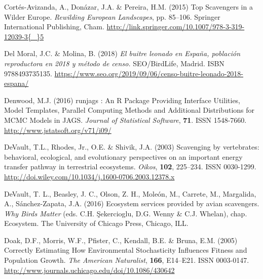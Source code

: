 \documentclass[12pt]{article}
\begin{document}
\begin{thebibliography}{87}
	Cort{\'{e}}s-Avizanda, A., Don{\'{a}}zar, J.A. \& Pereira, H.M. (2015) {Top
		Scavengers in a Wilder Europe}.
	\newblock  \emph{Rewilding European Landscapes}, pp. 85--106. Springer
	International Publishing, Cham.
	\newline\urlprefix\url{http://link.springer.com/10.1007/978-3-319-12039-3{\_}5}
	
	{Del Moral}, J.C. \& Molina, B. (2018) \emph{{El buitre leonado en
			Espa{\~{n}}a, poblaci{\'{o}}n reproductora en 2018 y m{\'{e}}todo de censo.}}
	\newblock SEO/BirdLife, Madrid.
	\newblock ISBN 9788493735135.
	\newline\urlprefix\url{https://www.seo.org/2019/09/06/censo-buitre-leonado-2018-espana/}
	
	Denwood, M.J. (2016) {runjags : An R Package Providing Interface Utilities,
		Model Templates, Parallel Computing Methods and Additional Distributions for
		MCMC Models in JAGS}.
	\newblock \emph{Journal of Statistical Software}, \textbf{71}.
	\newblock ISSN 1548-7660.
	\newline\urlprefix\url{http://www.jstatsoft.org/v71/i09/}
	
	DeVault, T.L., {Rhodes, Jr.}, O.E. \& Shivik, J.A. (2003) {Scavenging by
		vertebrates: behavioral, ecological, and evolutionary perspectives on an
		important energy transfer pathway in terrestrial ecosystems}.
	\newblock \emph{Oikos}, \textbf{102}, 225--234.
	\newblock ISSN 0030-1299.
	\newline\urlprefix\url{http://doi.wiley.com/10.1034/j.1600-0706.2003.12378.x}
	
	{DeVault, T. L., Beasley, J. C., Olson, Z. H., Mole{\'{o}}n, M., Carrete, M.,
		Margalida, A., S{\'{a}}nchez-Zapata}, J.A. (2016) {Ecosystem services
		provided by avian scavengers}.
	\newblock  \emph{Why Birds Matter} (eds. C.H. Şekercioglu, D.G. Wenny \& C.J.
	Whelan), chap. Ecosystem. The University of Chicago Press, Chicago, ILL.
	
	Doak, D.F., Morris, W.F., Pfister, C., Kendall, B.E. \& Bruna, E.M. (2005)
	{Correctly Estimating How Environmental Stochasticity Influences Fitness and
		Population Growth}.
	\newblock \emph{The American Naturalist}, \textbf{166}, E14--E21.
	\newblock ISSN 0003-0147.
	\newline\urlprefix\url{http://www.journals.uchicago.edu/doi/10.1086/430642}
	

\end{thebibliography}
\end{document}
